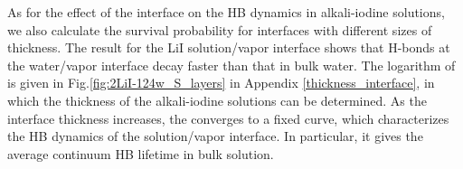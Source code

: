 %
As for the effect of the interface on the HB dynamics in alkali-iodine solutions,
we also calculate the survival probability for interfaces with different sizes of thickness. 
The result for the LiI solution/vapor interface shows that H-bonds at the water/vapor interface decay faster than that in bulk water.
The logarithm of \SHB is given in Fig.\thinspace\ref{fig:2LiI-124w_S_layers} in Appendix \ref{thickness_interface}, 
in which the thickness of the alkali-iodine solutions can be determined.
As the interface thickness increases, the \SHB converges to a fixed curve, 
which characterizes the HB dynamics of the solution/vapor interface. 
In particular, it gives the average continuum HB lifetime in bulk solution.
